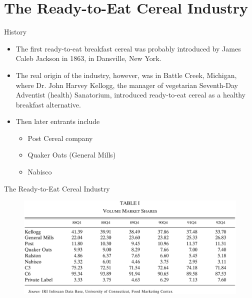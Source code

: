 \documentclass{beamer}
\begin{document}
\section{The Ready-to-Eat Cereal Industry}
\begin{frame}
	\transfade
	\tableofcontents[sectionstyle=show/shaded,subsectionstyle=show/shaded/hide]
	\addtocounter{framenumber}{-1}
\end{frame}
\begin{frame}[label=history]{History}
	\begin{itemize}
		\item The first ready-to-eat breakfast cereal was probably introduced by James Caleb Jackson in 1863, in Dansville, New York.
		\item The real origin of the industry, however, was in Battle Creek, Michigan, where Dr. John Harvey Kellogg, the manager of vegetarian Seventh-Day Adventist (health) Sanatorium, introduced ready-to-eat cereal as a healthy breakfast alternative.
		\item Then later entrants include
		\begin{itemize}
			\item Post Cereal company
			\item Quaker Oats (General Mills)
			\item Nabisco
		\end{itemize}
	\end{itemize}
	\hyperlink{motivation}{}
\end{frame}
\begin{frame}{The Ready-to-Eat Cereal Industry}
	\begin{figure}[h]
		\centering
		\includegraphics[scale=0.2]{table1.png}
	\end{figure}
\end{frame}
\end{document}

